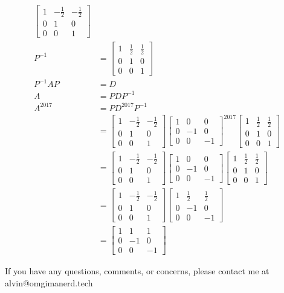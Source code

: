 \documentclass{math}
\begin{document}
\begin{align*}
\begin{bmatrix}
    1 & -\frac{1}{2} & -\frac{1}{2} \\
    0 & 1 & 0 \\
    0 & 0 & 1
  \end{bmatrix} \\
  P^{-1} &= \begin{bmatrix}
    1 & \frac{1}{2} & \frac{1}{2} \\
    0 & 1 & 0 \\
    0 & 0 & 1
  \end{bmatrix} \\
  P^{-1}AP &= D \\
  A &= PDP^{-1} \\
  A^{2017} &= PD^{2017}P^{-1} \\
  &= \begin{bmatrix}
    1 & -\frac{1}{2} & -\frac{1}{2} \\
    0 & 1 & 0 \\
    0 & 0 & 1
  \end{bmatrix}\begin{bmatrix}
    1 & 0 & 0 \\
    0 & -1 & 0 \\
    0 & 0 & -1
  \end{bmatrix}^{2017}\begin{bmatrix}
    1 & \frac{1}{2} & \frac{1}{2} \\
    0 & 1 & 0 \\
    0 & 0 & 1
  \end{bmatrix} \\
  &= \begin{bmatrix}
    1 & -\frac{1}{2} & -\frac{1}{2} \\
    0 & 1 & 0 \\
    0 & 0 & 1
  \end{bmatrix}\begin{bmatrix}
    1 & 0 & 0 \\
    0 & -1 & 0 \\
    0 & 0 & -1
  \end{bmatrix}\begin{bmatrix}
    1 & \frac{1}{2} & \frac{1}{2} \\
    0 & 1 & 0 \\
    0 & 0 & 1
  \end{bmatrix} \\
  &= \begin{bmatrix}
    1 & -\frac{1}{2} & -\frac{1}{2} \\
    0 & 1 & 0 \\
    0 & 0 & 1
  \end{bmatrix}\begin{bmatrix}
    1 & \frac{1}{2} & \frac{1}{2} \\
    0 & -1 & 0 \\
    0 & 0 & -1
  \end{bmatrix} \\
  &= \begin{bmatrix}
    1 & 1 & 1 \\
    0 & -1 & 0 \\
    0 & 0 & -1
  \end{bmatrix}
\end{align*}

\begin{center}
  If you have any questions, comments, or concerns, please contact me at
  alvin@omgimanerd.tech
\end{center}
\end{document}
